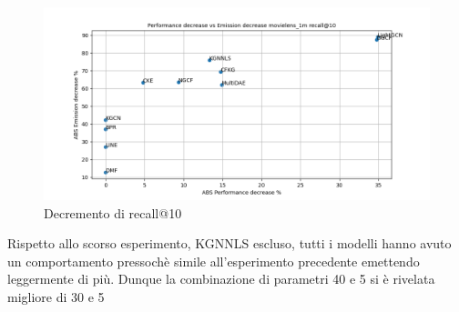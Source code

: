 \begin{figure}[H]
    \centering
    \includegraphics[scale=0.5]{images/decrement_recall@10_movielens_1m_40_6.png}
    \caption{Decremento di recall@10}
\end{figure}
\noindent Rispetto allo scorso esperimento, KGNNLS escluso, tutti i modelli hanno avuto un comportamento pressochè simile all'esperimento precedente emettendo leggermente di più. Dunque la combinazione di parametri 40 e 5 si è rivelata migliore di 30 e 5
